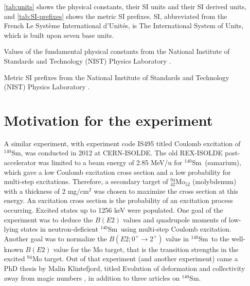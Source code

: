 \documentclass[twoside,english]{uiofysmaster/uiofysmaster}
\newcommand{\Sm}{$^{140}$Sm} %
\let\orgautoref\autoref
\renewcommand{\autoref}
        {%
		 \def\sectionautorefname{Section}%
		 \def\subsectionautorefname{Section}%
		 \def\subsubsectionautorefname{Section}%
		 \def\chapterautorefname{Chapter}%
          \orgautoref}
\begin{document}
\autoref{tab:units} shows the physical constants, their SI units and their SI derived units, and
\autoref{tab:SI-prefixes} shows the metric SI prefixes.
SI, abbreviated from the French Le Syst{\`{e}}me International d'Unit{\'{e}}s, is The International System of Units, which is built upon seven base units.

\begin{table}[htb] 
    \centering 
    \caption{Values of the fundamental physical constants from the National Institute of Standards and Technology (NIST) Physics Laboratory \cite{units}.}
	
	\label{tab:units}
\end{table}

\begin{table}[htb] 
    \centering 
    \caption{Metric SI prefixes from the National Institute of Standards and Technology (NIST) Physics Laboratory \cite{units}.}
	
	\label{tab:SI-prefixes}
\end{table}


\section{Motivation for the experiment}

A similar experiment, with experiment code IS495 titled Coulomb excitation of \Sm, was conducted in 2012 at CERN-ISOLDE.
The old REX-ISOLDE post-accelerator was limited to a beam energy of 2.85 MeV/u for \Sm\ (samarium), which gave a low Coulomb excitation cross section and a low probability for multi-step excitations. 
Therefore, a secondary target of $^{94}_{42}$Mo$_{52}$ (molybdenum) with a thickness of 2 mg/cm$^2$ was chosen to maximize the cross section at this energy.
An excitation cross section is the probability of an excitation process occurring.
Excited states up to 1256 keV were populated.
One goal of the experiment was to deduce the $B(E2)$ values and quadrupole moments of low-lying states in neutron-deficient \Sm\ using multi-step Coulomb excitation.
Another goal was to normalize the $B(E2; 0^+ \rightarrow 2^+)$ value in \Sm\ to the well-known $B(E2)$ value for the Mo target, that is the transition strengths in the excited $^{94}$Mo target.
Out of that experiment (and another experiment) came a PhD thesis by Malin Klintefjord, titled Evolution of deformation and collectivity away from magic numbers \cite{Klintefjord}, in addition to three articles \cite{Klintefjord2015, Samorajczyk2015, Klintefjord2016} on \Sm.
\end{document}
